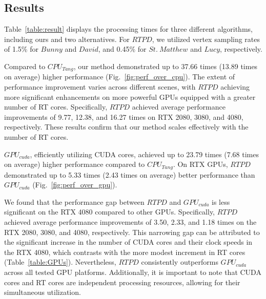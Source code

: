 \subsection{Results}



Table~\ref{table:result} displays the processing times for three different algorithms, including ours and two alternatives.
For $RTPD$, we utilized vertex sampling rates of 1.5\% for $Bunny$ and $David$, and 0.45\% for $St.~Matthew$ and $Lucy$, respectively.

Compared to $CPU_{Tang}$, our method demonstrated up to 37.66 times (13.89 times on average) higher performance (Fig.~\ref{fig:perf_over_cpu}).
The extent of performance improvement varies across different scenes, with $RTPD$ achieving more significant enhancements on more powerful GPUs equipped with a greater number of RT cores.
Specifically, $RTPD$ achieved average performance improvements of 9.77, 12.38, and 16.27 times on RTX 2080, 3080, and 4080, respectively.
These results confirm that our method scales effectively with the number of RT cores.


$GPU_{cuda}$, efficiently utilizing CUDA cores, achieved up to 23.79 times (7.68 times on average) higher performance compared to $CPU_{Tang}$.
On RTX GPUs, $RTPD$ demonstrated up to 5.33 times (2.43 times on average) better performance than $GPU_{cuda}$ (Fig.~\ref{fig:perf_over_gpu}).



We found that the performance gap between $RTPD$ and $GPU_{cuda}$ is less significant on the RTX 4080 compared to other GPUs.
Specifically, $RTPD$ achieved average performance improvements of 3.50, 2.33, and 1.18 times on the RTX 2080, 3080, and 4080, respectively.
This narrowing gap can be attributed to the significant increase in the number of CUDA cores and their clock speeds in the RTX 4080, which contrasts with the more modest increment in RT cores (Table~\ref{table:GPUs}).
Nevertheless, $RTPD$ consistently outperforms $GPU_{cuda}$ across all tested GPU platforms.
Additionally, it is important to note that CUDA cores and RT cores are independent processing resources, allowing for their simultaneous utilization.

